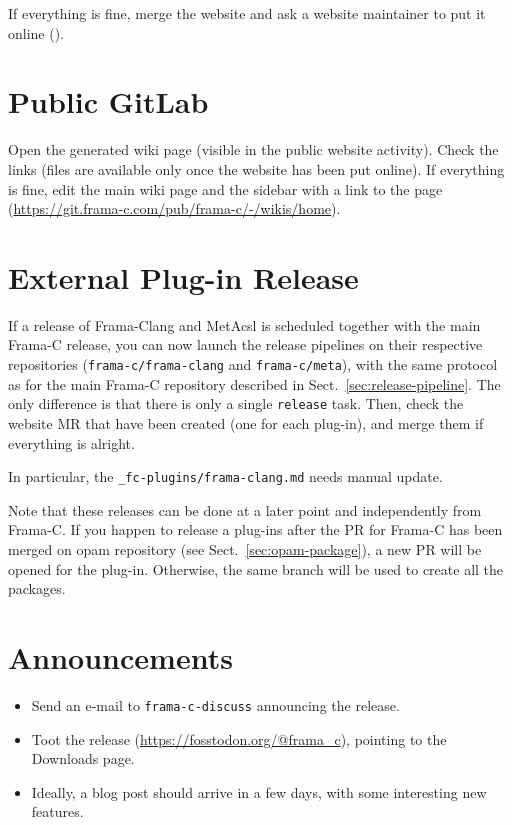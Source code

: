 If everything is fine, merge the website and ask a website maintainer to put it
online ().

\section{Public GitLab}
\label{sec:public-gitlab}

Open the generated wiki page (visible in the public website activity). Check the
links (files are available only once the website has been put online). If
everything is fine, edit the main wiki page and the sidebar with a link to the
page (\url{https://git.frama-c.com/pub/frama-c/-/wikis/home}).

\section{External Plug-in Release}
\label{sec:ext-plug-ins-release}

If a release of Frama-Clang and MetAcsl is scheduled together
with the main Frama-C release, you can now launch the release pipelines
on their respective repositories (\texttt{frama-c/frama-clang} and
\texttt{frama-c/meta}), with the same protocol as for the main
Frama-C repository described in Sect.~\ref{sec:release-pipeline}.
The only difference is that there is only a single \texttt{release}
 task.
Then, check the website MR that have been created (one for each
plug-in), and merge them if everything is alright.

In particular, the \texttt{\_fc-plugins/frama-clang.md} needs manual
update.

Note that these releases can be done at a later point and independently from
Frama-C. If you happen to release a plug-ins after the PR for Frama-C has been
merged on opam repository (see Sect.~\ref{sec:opam-package}), a new PR will be
opened for the plug-in. Otherwise, the same branch will be used to create all
the packages.

\section{Announcements}
\label{sec:announcements}

\begin{itemize}
\item Send an e-mail to \texttt{frama-c-discuss} announcing the release.
\item Toot the release (\url{https://fosstodon.org/@frama_c}),
  pointing to the Downloads page.
\item Ideally, a blog post should arrive in a few days, with some interesting
  new features.
\end{itemize}

